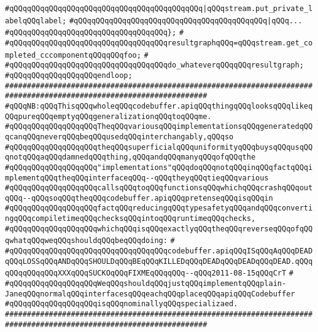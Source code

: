 \verb|#qQQqqQQqqQQqqQQqqQQqqQQqqQQqqQQqqQQqqQQqqQQq|\verb#|qQQqstream.put_private_labelqQQqlabel;#\newline
\verb|#qQQqqQQqqQQqqQQqqQQqqQQqqQQqqQQqqQQqqQQqqQQq|\verb#|qQQq...#\newline
\verb|#qQQqqQQqqQQqqQQqqQQqqQQqqQQqqQQqqQQq};|\newline
\verb|#|\newline
\verb|#qQQqqQQqqQQqqQQqqQQqqQQqqQQqqQQqqQQqresultgraphqQQq=qQQqstream.get_completed_cccomponentqQQqqQQqfoo;|\newline
\verb|#|\newline
\verb|#qQQqqQQqqQQqqQQqqQQqqQQqqQQqqQQqqQQqdo_whateverqQQqqQQqresultgraph;|\newline
\verb|#qQQqqQQqqQQqqQQqqQQqendloop;|\newline
\newline
\newline
\newline
\verb|####################################################################################################################|\newline
\verb|#qQQqNB:qQQqThisqQQqwholeqQQqcodebuffer.apiqQQqthingqQQqlooksqQQqlikeqQQqpureqQQqemptyqQQqgeneralizationqQQqtoqQQqme.|\newline
\verb|#qQQqqQQqqQQqqQQqqQQqTheqQQqvariousqQQqimplementationsqQQqgeneratedqQQqcanqQQqneverqQQqbeqQQqusedqQQqinterchangably,qQQqso|\newline
\verb|#qQQqqQQqqQQqqQQqqQQqtheqQQqsuperficialqQQquniformityqQQqbuysqQQqusqQQqnotqQQqaqQQqdamnedqQQqthing,qQQqandqQQqmanyqQQqofqQQqthe|\newline
\verb|#qQQqqQQqqQQqqQQqqQQq"implementations"qQQqdoqQQqnotqQQqinqQQqfactqQQqimplementqQQqtheqQQqinterfaceqQQq--qQQqtheyqQQqtieqQQqvarious|\newline
\verb|#qQQqqQQqqQQqqQQqqQQqcallsqQQqtoqQQqfunctionsqQQqwhichqQQqcrashqQQqoutqQQq--qQQqsoqQQqtheqQQqcodebuffer.apiqQQqpretenseqQQqisqQQqin|\newline
\verb|#qQQqqQQqqQQqqQQqqQQqfactqQQqreducingqQQqtypesafetyqQQqandqQQqconvertingqQQqcompiletimeqQQqchecksqQQqintoqQQqruntimeqQQqchecks,|\newline
\verb|#qQQqqQQqqQQqqQQqqQQqwhichqQQqisqQQqexactlyqQQqtheqQQqreverseqQQqofqQQqwhatqQQqweqQQqshouldqQQqbeqQQqdoing:|\newline
\verb|#|\newline
\verb|#qQQqqQQqqQQqqQQqqQQqqQQqqQQqqQQqqQQqcodebuffer.apiqQQqISqQQqAqQQqDEADqQQqLOSSqQQqANDqQQqSHOULDqQQqBEqQQqKILLEDqQQqDEADqQQqDEADqQQqDEAD.qQQqqQQqqQQqqQQqXXXqQQqSUCKOqQQqFIXMEqQQqqQQq--qQQq2011-08-15qQQqCrT|\newline
\verb|#|\newline
\verb|#qQQqqQQqqQQqqQQqqQQqWeqQQqshouldqQQqjustqQQqimplementqQQqplain-JaneqQQqnormalqQQqinterfacesqQQqeachqQQqplaceqQQqapiqQQqCodebuffer|\newline
\verb|#qQQqqQQqqQQqqQQqqQQqisqQQqnominallyqQQqspecializaed.|\newline
\verb|####################################################################################################################|\newline

